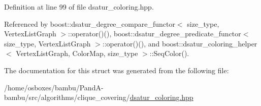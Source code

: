 Definition at line 99 of file dsatur\+\_\+coloring.\+hpp.



Referenced by boost\+::dsatur\+\_\+degree\+\_\+compare\+\_\+functor$<$ size\+\_\+type, Vertex\+List\+Graph $>$\+::operator()(), boost\+::dsatur\+\_\+degree\+\_\+predicate\+\_\+functor$<$ size\+\_\+type, Vertex\+List\+Graph $>$\+::operator()(), and boost\+::dsatur\+\_\+coloring\+\_\+helper$<$ Vertex\+List\+Graph, Color\+Map, size\+\_\+type $>$\+::\+Seq\+Color().



The documentation for this struct was generated from the following file\+:\begin{DoxyCompactItemize}
\item 
/home/osboxes/bambu/\+Pand\+A-\/bambu/src/algorithms/clique\+\_\+covering/\hyperlink{dsatur__coloring_8hpp}{dsatur\+\_\+coloring.\+hpp}\end{DoxyCompactItemize}
